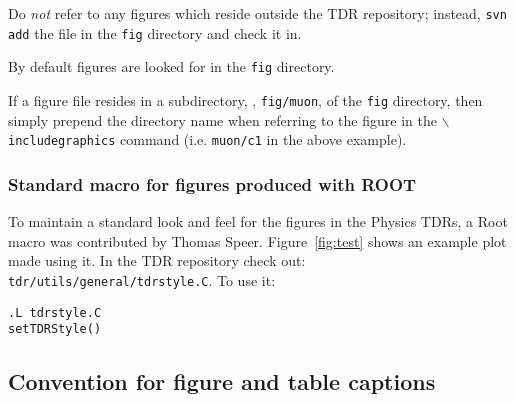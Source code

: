 Do \emph{not} refer to any figures which reside outside the
TDR repository; instead, \texttt{svn add} the file in the \texttt{fig}
directory and check it in.

By default figures are looked for in the \texttt{fig} directory.

If a figure file resides in a subdirectory, \eg, \texttt{fig/muon},
of the \texttt{fig} directory, then simply prepend the directory
name when referring to the figure in the
\texttt{$\backslash${}includegraphics} command (i.e. \texttt{muon/c1} in the
above example).



\subsubsection{Standard macro for figures produced with ROOT \label{sec:root}}

To maintain a standard look and feel for the figures in the Physics
TDRs, a Root macro was
contributed by Thomas Speer. Figure~\ref{fig:test} shows an example
plot made using it. In the TDR repository check out:
\texttt{tdr/utils/general/tdrstyle.C}. To use it:
%
\begin{verbatim}
.L tdrstyle.C
setTDRStyle()
\end{verbatim}

\subsection{Convention for figure and table captions}

